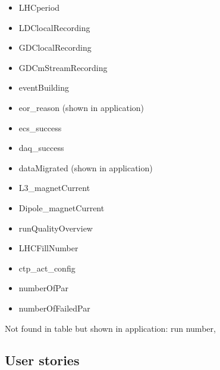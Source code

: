 \begin{itemize}
  \item LHCperiod	
  \item LDClocalRecording	
  \item GDClocalRecording	
  \item GDCmStreamRecording	
  \item eventBuilding	
  \item eor\_reason (shown in application)
  \item ecs\_success	
  \item daq\_success	
  \item dataMigrated (shown in application)
  \item L3\_magnetCurrent	
  \item Dipole\_magnetCurrent	
  \item runQualityOverview	
  \item LHCFillNumber	
  \item ctp\_act\_config	
  \item numberOfPar	
  \item numberOfFailedPar
\end{itemize}
Not found in table but shown in application: run number, 

\subsection{User stories}
